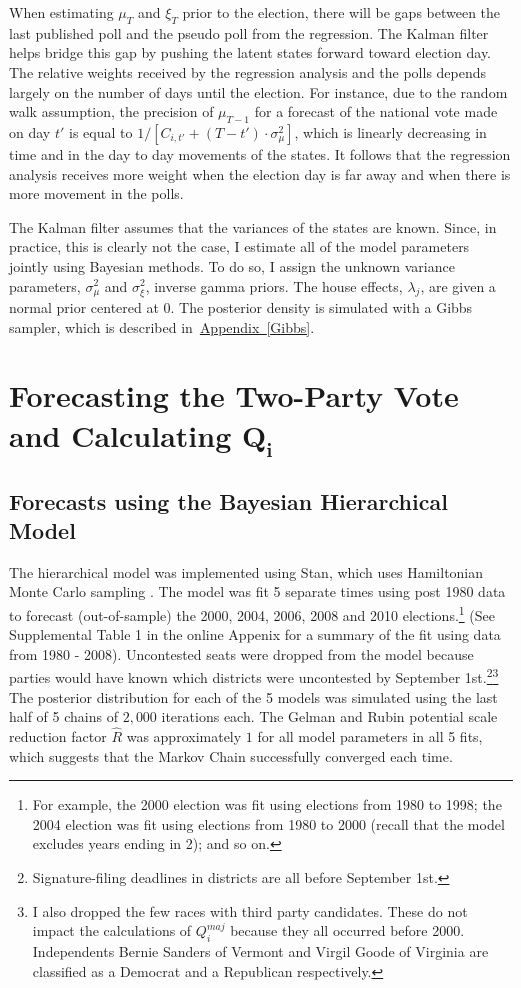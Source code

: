 \documentclass[12pt,final,fleqn]{article}
\newcommand{\aref}[1]{\hyperref[#1]{Appendix~\ref{#1}}}
\theoremstyle{plain}
\begin{document}
When estimating $\mu_T$ and $\xi_T$ prior to the election, there will be gaps between the last published poll and the pseudo poll from the regression. The Kalman filter helps bridge this gap by pushing the latent states forward toward election day. The relative weights received by the regression analysis and the polls depends largely on the number of days until the election. For instance, due to the random walk assumption, the precision of $\mu_{T-1}$ for a forecast of the national vote made on day $t'$ is equal to $1/\left[C_{i,t'} + (T-t')\cdot \sigma^2_\mu\right]$, which is linearly decreasing in time and in the day to day movements of the states. It follows that the regression analysis receives more weight when the election day is far away and when there is more movement in the polls.  

The Kalman filter assumes that the variances of the states are known. Since, in practice, this is clearly not the case, I estimate all of the model parameters jointly using Bayesian methods. To do so, I assign the unknown variance parameters, $\sigma_\mu^2$ and $\sigma_\xi^2$, inverse gamma priors. The house effects, $\lambda_j$, are given a normal prior centered at $0$. The posterior density is simulated with a Gibbs sampler, which is described in~\aref{Gibbs}.

\section{Forecasting the Two-Party Vote and Calculating $\mathbf{Q_i}$}
\subsection{Forecasts using the Bayesian Hierarchical Model} \label{sec: results hierarchical model}
The hierarchical model was implemented using Stan, which uses Hamiltonian Monte Carlo sampling \citep{dev2016rstan}. The model was fit 5 separate times using post 1980 data to forecast (out-of-sample) the 2000, 2004, 2006, 2008 and 2010 elections.\footnote{For example, the 2000 election was fit using elections from 1980 to 1998; the 2004 election was fit using elections from 1980 to 2000 (recall that the model excludes years ending in 2); and so on.} (See Supplemental Table 1 in the online Appenix for a summary of the fit using data from 1980 - 2008). Uncontested seats were dropped from the model because parties would have known which districts were uncontested by September 1st.\footnote{Signature-filing deadlines in districts are all before September 1st.}\footnote{I also dropped the few races with third party candidates. These do not impact the calculations of $Q_i^{maj}$ because they all occurred before 2000. Independents Bernie Sanders of Vermont and Virgil Goode of Virginia are classified as a Democrat and a Republican respectively. } The posterior distribution for each of the 5 models was simulated using the last half of 5 chains of $2,000$ iterations each. The Gelman and Rubin potential scale reduction factor $\hat{R}$ was approximately $1$ for all model parameters in all 5 fits, which suggests that the Markov Chain successfully converged each time.
\end{document}

